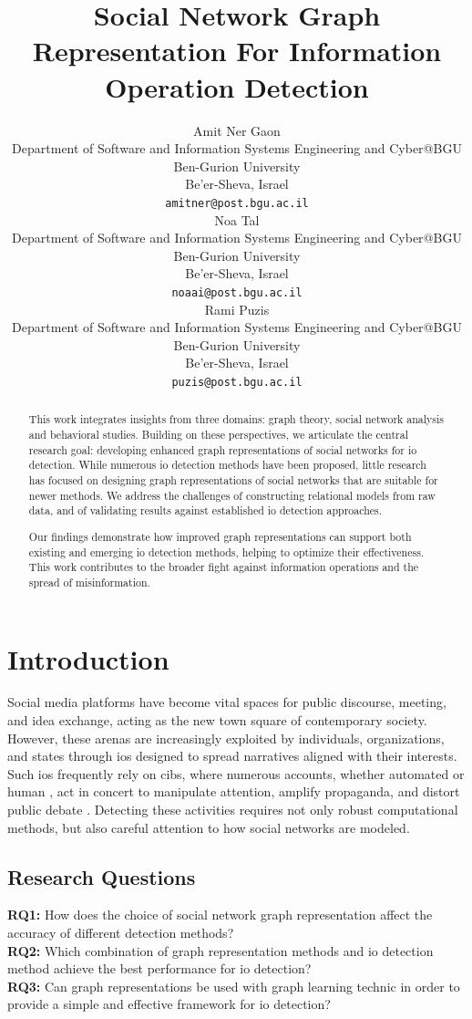 \documentclass{article}
\title{Social Network Graph Representation For Information Operation Detection}
\author{
 Amit Ner Gaon \\
  Department of Software and Information Systems Engineering and Cyber@BGU\\
  Ben-Gurion University\\
  Be'er-Sheva, Israel \\
  \texttt{amitner@post.bgu.ac.il} \\
   \And
 Noa Tal \\
  Department of Software and Information Systems Engineering and Cyber@BGU\\
  Ben-Gurion University\\
  Be'er-Sheva, Israel \\
  \texttt{noaai@post.bgu.ac.il} \\
  \And
 Rami Puzis \\
  Department of Software and Information Systems Engineering and Cyber@BGU\\
  Ben-Gurion University\\
  Be'er-Sheva, Israel \\
  \texttt{puzis@post.bgu.ac.il} \\
}
\begin{document}
\maketitle
\begin{abstract}
This work integrates insights from three domains: graph theory, social network analysis and behavioral studies. Building on these perspectives, we articulate the central research goal: developing enhanced graph representations of social networks for \ac{io} detection. While numerous \ac{io} detection methods have been proposed, little research has focused on designing graph representations of social networks that are suitable for newer methods. We address the challenges of constructing relational models from raw data, and of validating results against established \ac{io} detection approaches.

Our findings demonstrate how improved graph representations can support both existing and emerging \ac{io} detection methods, helping to optimize their effectiveness. This work contributes to the broader fight against information operations and the spread of misinformation.
\end{abstract}




\section{Introduction}
Social media platforms have become vital spaces for public discourse, meeting, and idea exchange, acting as the new town square of contemporary society. However, these arenas are increasingly exploited by individuals, organizations, and states through \acp{io} designed to spread narratives aligned with their interests. Such \acp{io} frequently rely on \acp{cib}, where numerous accounts, whether automated or human , act in concert to manipulate attention, amplify propaganda, and distort public debate \cite{mannocci2024detection}. Detecting these activities requires not only robust computational methods, but also careful attention to how social networks are modeled.

\subsection{Research Questions}
\textbf{RQ1:} How does the choice of social network graph representation affect the accuracy of different detection methods? \\[4pt]
\textbf{RQ2:} Which combination of graph representation methods and \ac{io} detection method achieve the best performance for \ac{io} detection? \\[4pt]
\textbf{RQ3:} Can graph representations be used with graph learning technic in order to provide a simple and effective framework for \ac{io} detection? \\
\end{document}
